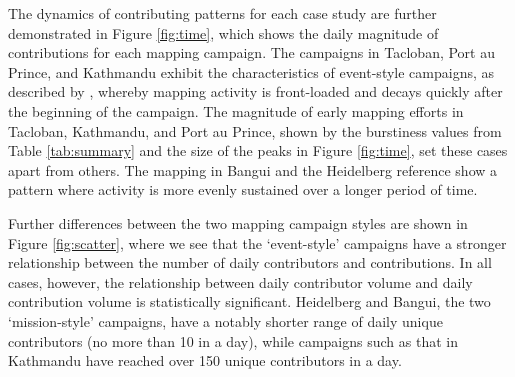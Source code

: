 The dynamics of contributing patterns for each case study are further demonstrated in Figure \ref{fig:time}, which shows the daily magnitude of contributions for each mapping campaign. The campaigns in Tacloban, Port au Prince, and Kathmandu exhibit the characteristics of event-style campaigns, as described by \textcite{dittus_mass_2017}, whereby mapping activity is front-loaded and decays quickly after the beginning of the campaign. The magnitude of early mapping efforts in Tacloban, Kathmandu, and Port au Prince, shown by the burstiness values from Table \ref{tab:summary} and the size of the peaks in Figure \ref{fig:time}, set these cases apart from others. The mapping in Bangui and the Heidelberg reference show a pattern where activity is more evenly sustained over a longer period of time. 

Further differences between the two mapping campaign styles are shown in Figure \ref{fig:scatter}, where we see that the ‘event-style’ campaigns have a stronger relationship between the number of daily contributors and contributions.  In all cases, however, the relationship between daily contributor volume and daily contribution volume is statistically significant. Heidelberg and Bangui, the two ‘mission-style’ campaigns, have a notably shorter range of daily unique contributors (no more than 10 in a day), while campaigns such as that in Kathmandu have reached over 150 unique contributors in a day. 

